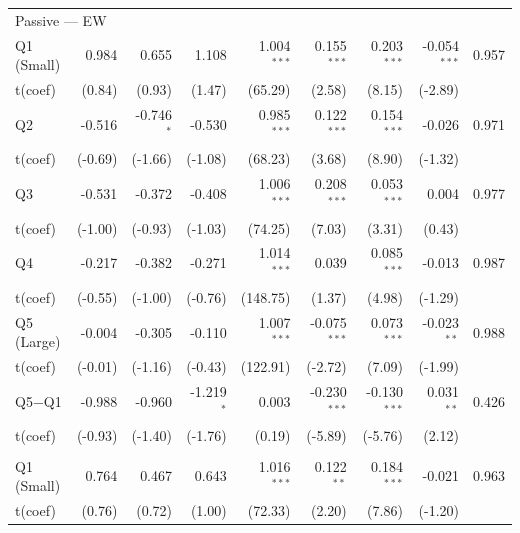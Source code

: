 \begin{table}[!htbp]
{\begin{tabular*}{\linewidth}{@{\extracolsep{\fill}}lrrrrrrrr}
\midrule
\multicolumn{9}{l}{Passive --- EW}\\
\hspace{1em}Q1 (Small) & 0.984 & 0.655 & 1.108 & 1.004$^{***}$ & 0.155$^{***}$ & 0.203$^{***}$ & -0.054$^{***}$ & 0.957\\
\hspace{1em}t(coef) & (0.84) & (0.93) & (1.47) & (65.29) & (2.58) & (8.15) & (-2.89) & \\
\hspace{1em}Q2 & -0.516 & -0.746$^{*}$ & -0.530 & 0.985$^{***}$ & 0.122$^{***}$ & 0.154$^{***}$ & -0.026 & 0.971\\
\hspace{1em}t(coef) & (-0.69) & (-1.66) & (-1.08) & (68.23) & (3.68) & (8.90) & (-1.32) & \\
\hspace{1em}Q3 & -0.531 & -0.372 & -0.408 & 1.006$^{***}$ & 0.208$^{***}$ & 0.053$^{***}$ & 0.004 & 0.977\\
\hspace{1em}t(coef) & (-1.00) & (-0.93) & (-1.03) & (74.25) & (7.03) & (3.31) & (0.43) & \\
\hspace{1em}Q4 & -0.217 & -0.382 & -0.271 & 1.014$^{***}$ & 0.039 & 0.085$^{***}$ & -0.013 & 0.987\\
\hspace{1em}t(coef) & (-0.55) & (-1.00) & (-0.76) & (148.75) & (1.37) & (4.98) & (-1.29) & \\
\hspace{1em}Q5 (Large) & -0.004 & -0.305 & -0.110 & 1.007$^{***}$ & -0.075$^{***}$ & 0.073$^{***}$ & -0.023$^{**}$ & 0.988\\
\hspace{1em}t(coef) & (-0.01) & (-1.16) & (-0.43) & (122.91) & (-2.72) & (7.09) & (-1.99) & \\
\hspace{1em}Q5$-$Q1 & -0.988 & -0.960 & -1.219$^{*}$ & 0.003 & -0.230$^{***}$ & -0.130$^{***}$ & 0.031$^{**}$ & 0.426\\
\hspace{1em}t(coef) & (-0.93) & (-1.40) & (-1.76) & (0.19) & (-5.89) & (-5.76) & (2.12) & \\
\addlinespace[0.3em]
\hline
\multicolumn{9}{l}{Passive --- VW}\\
\hspace{1em}Q1 (Small) & 0.764 & 0.467 & 0.643 & 1.016$^{***}$ & 0.122$^{**}$ & 0.184$^{***}$ & -0.021 & 0.963\\
\hspace{1em}t(coef) & (0.76) & (0.72) & (1.00) & (72.33) & (2.20) & (7.86) & (-1.20) & \\

\end{tabular*}}
\end{table}
